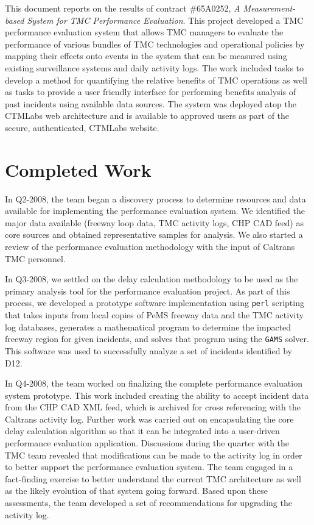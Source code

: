 
This document reports on the results of contract \#65A0252, \emph{A
  Measurement-based System for TMC Performance Evaluation}.  This
project developed a TMC performance evaluation system that allows TMC
managers to evaluate the performance of various bundles of TMC
technologies and operational policies by mapping their effects onto
events in the system that can be measured using existing surveillance
systems and daily activity logs.  The work included tasks to develop a
method for quantifying the relative benefits of TMC operations as well
as tasks to provide a user friendly interface for performing benefits
analysis of past incidents using available data sources.  The system
was deployed atop the CTMLabs web architecture and is available to
approved users as part of the secure, authenticated, CTMLabs website.

\section*{Completed Work}
\label{execsum-sum-of-work}

In Q2-2008, the team began a discovery process to determine resources and data
available for implementing the performance evaluation system. We identified the
major data available (freeway loop data, TMC activity logs, CHP CAD feed) as
core sources and obtained representative samples for analysis.  We also started
a review of the performance evaluation methodology with the input of Caltrans
TMC personnel.

In Q3-2008, we settled on the delay calculation methodology to be used as the
primary analysis tool for the performance evaluation project.  As part of this
process, we developed a prototype software implementation using \texttt{perl}
scripting that takes inputs from local copies of PeMS freeway data and the TMC
activity log databases, generates a mathematical program to determine the
impacted freeway region for given incidents, and solves that program using the
\texttt{GAMS} solver.  This software was used to successfully analyze a set of
incidents identified by D12.

In Q4-2008, the team worked on finalizing the complete performance evaluation
system prototype. This work included creating the ability to accept incident
data from the CHP CAD XML feed, which is archived for cross referencing with the
Caltrans activity log.  Further work was carried out on encapsulating the core
delay calculation algorithm so that it can be integrated into a user-driven
performance evaluation application.  Discussions during the quarter with the TMC
team revealed that modifications can be made to the activity log in order to
better support the performance evaluation system.  The team engaged in a
fact-finding exercise to better understand the current TMC architecture as well
as the likely evolution of that system going forward. Based upon these
assessments, the team developed a set of recommendations for upgrading the
activity log.

